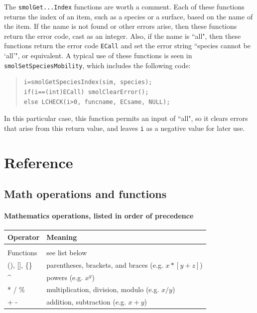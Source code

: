 \documentclass {scrbook}
\newcommand {\ttt} {\texttt}
\begin{document}
The \ttt{smolGet...Index} functions are worth a comment. Each of these functions returns the index of an item, such as a species or a surface, based on the name of the item. If the name is not found or other errors arise, then these functions return the error code, cast as an integer. Also, if the name is ``all", then these functions return the error code \ttt{ECall} and set the error string ``species cannot be `all'", or equivalent. A typical use of these functions is seen in \ttt{smolSetSpeciesMobility}, which includes the following code:

\begin{quote}
\begin{lstlisting}[style=SSAC]
i=smolGetSpeciesIndex(sim, species);
if(i==(int)ECall) smolClearError();
else LCHECK(i>0, funcname, ECsame, NULL);
\end{lstlisting}
\end{quote}

In this particular case, this function permits an input of ``all", so it clears errors that arise from this return value, and leaves \ttt{i} as a negative value for later use.

\part{Reference}

\chapter{Math operations and functions}

\subsection*{Mathematics operations, listed in order of precedence}

\begin{longtable}[c]{ll}
Operator & Meaning\\
\hline \\
Functions & see list below\\
(), [], \{\} & parentheses, brackets, and braces (e.g. $x*[y+z]$)\\
\^{} & powers (e.g. $x^y$)\\
* / \% & multiplication, division, modulo (e.g. $x/y$)\\
+ - & addition, subtraction (e.g. $x+y$)
\end{longtable}
\end{document}
